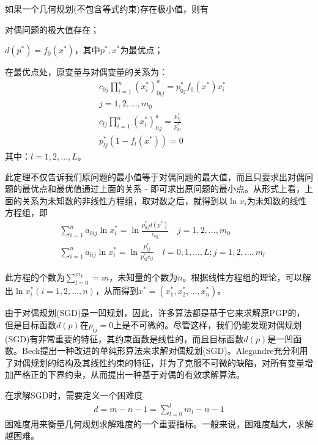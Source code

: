         \begin{theorem}
        如果一个几何规划(不包含等式约束)存在极小值，则有
        \par
        对偶问题的极大值存在；
        \par
        $d(p^*)=f_0(x^*)$，其中$p^*,x^*$为最优点；
        \par
        在最优点处，原变量与对偶变量的关系为：
        \begin{align*}
        &c_{0j}\mathop{\prod}\limits_{i=1}^{n}(x^*_i)_{0ij}^a=p_{0j}^*f_0(x^*)x_i^*\\
        & j=1,2,\ldots,m_0\\
        &c_{lj}\mathop{\prod}\limits_{i=1}^{n}(x^*_i)_{lij}^a=\frac{p_{lj}^*}{p_{l0}^*}\\
        &p_{lj}^*(1-f_l(x^*))=0
        \end{align*}
        其中：$l=1,2,\ldots,L$。
        \end{theorem}
        \par
        此定理不仅告诉我们原问题的最小值等于对偶问题的最大值，而且只要求出对偶问题的最优点和最优值通过上面的关系 - 即可求出原问题的最小点。从形式上看，上面的关系为未知数的非线性方程组，取对数之后，就得到以${\ln}x_i$为未知数的线性方程组，即
        \begin{align*}
        &\mathop{\sum}\limits_{i=1}^{n}a_{0ij}{\ln}x_i^*=\ln \frac{p_{0j}^*d(p^*)}{c_{0j}}\quad j=1,2,\ldots,m_0\\
        &\mathop{\sum}\limits_{i=1}^{n}a_{lij}{\ln}x_i^*=\ln \frac{p_{ij}^*}{p_{l0}^*c_{lj}} \quad l=0,1,\ldots,L;j=1,2,\ldots,m_l
        \end{align*}
        \par
        此方程的个数为$\mathop{\sum}\limits_{l=0}^{m_L}=m$，未知量的个数为$n$。根据线性方程组的理论，可以解出${\ln}x_i^*(i=1,2,\ldots,n)$，从而得到$x^*=(x_1^*,x_2^*,\ldots,x_n^*)$。
        \par
        由于对偶规划(SGD)是一凹规划，因此，许多算法都是基于它来求解原PGP的，但是目标函数$d(p)$在$p_{lj}=0$上是不可微的。尽管这样，我们仍能发现对偶规划(SGD)有非常重要的特征，其约束函数是线性的，而且目标函数$d(p)$是一凹函数。Beck提出一种改进的单纯形算法来求解对偶规划(SGD)。Alegandre充分利用了对偶规划的结构及其线性约束的特征，并为了克服不可微的缺陷，对所有变量增加严格正的下界约束，从而提出一种基于对偶的有效求解算法。
        \par
        在求解SGD时，需要定义一个困难度
        \begin{align*}
        d=m-n-1=\mathop{\sum}\limits_{l=0}^{l}m_{l}-n-1
        \end{align*}
        困难度用来衡量几何规划求解难度的一个重要指标。一般来说，困难度越大，求解越困难。
